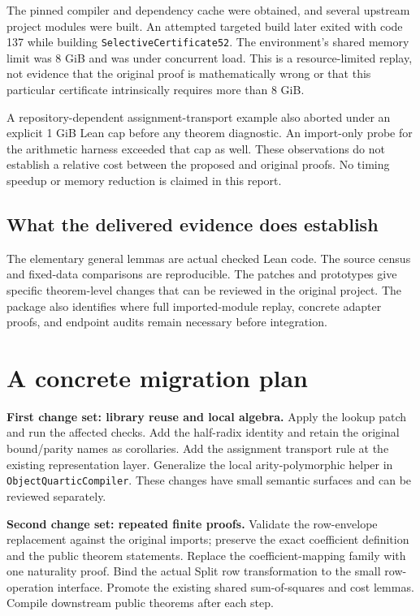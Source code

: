 \documentclass[11pt,letterpaper]{article}
\newcommand{\code}[1]{\nolinkurl{#1}}
\begin{document}
The pinned compiler and dependency cache were obtained, and several upstream
project modules were built. An attempted targeted build later exited with
code 137 while building \code{SelectiveCertificate52}. The environment's shared
memory limit was 8 GiB and was under concurrent load. This is a resource-limited
replay, not evidence that the original proof is mathematically wrong or that
this particular certificate intrinsically requires more than 8 GiB.

A repository-dependent assignment-transport example also aborted under an
explicit 1 GiB Lean cap before any theorem diagnostic. An import-only probe
for the arithmetic harness exceeded that cap as well. These observations do
not establish a relative cost between the proposed and original proofs.
No timing speedup or memory reduction is claimed in this report.

\subsection{What the delivered evidence does establish}

The elementary general lemmas are actual checked Lean code. The source census
and fixed-data comparisons are reproducible. The patches and prototypes give
specific theorem-level changes that can be reviewed in the original project.
The package also identifies where full imported-module replay, concrete adapter
proofs, and endpoint audits remain necessary before integration.

\section{A concrete migration plan}

\textbf{First change set: library reuse and local algebra.}
Apply the lookup patch and run the affected checks. Add the half-radix identity
and retain the original bound/parity names as corollaries. Add the assignment
transport rule at the existing representation layer. Generalize the local
arity-polymorphic helper in \code{ObjectQuarticCompiler}. These changes have
small semantic surfaces and can be reviewed separately.

\textbf{Second change set: repeated finite proofs.}
Validate the row-envelope replacement against the original imports; preserve
the exact coefficient definition and the public theorem statements. Replace
the coefficient-mapping family with one naturality proof. Bind the actual
Split row transformation to the small row-operation interface. Promote the
existing shared sum-of-squares and cost lemmas. Compile downstream public
theorems after each step.
\end{document}
